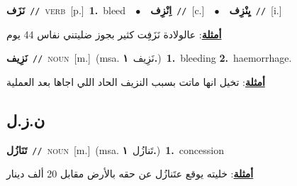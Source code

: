 \documentclass[10pt,a4paper,twoside]{article} %
\begin{document}
\begin{multicols}{2}
{\setlength\topsep{0pt}\textbf{\foreignlanguage{arabic}{نَزَف}}\ {\color{gray}\texttt{//}\color{black}}\ \textsc{verb}\ [p.]\ \textbf{1.}~bleed\ \ $\bullet$\ \ \setlength\topsep{0pt}\textbf{\foreignlanguage{arabic}{اِنْزِف}}\ {\color{gray}\texttt{//}\color{black}}\ [c.]\ \ $\bullet$\ \ \setlength\topsep{0pt}\textbf{\foreignlanguage{arabic}{يِنْزِف}}\ {\color{gray}\texttt{//}\color{black}}\ [i.]\  \begin{flushright}\color{gray}\foreignlanguage{arabic}{\textbf{\underline{\foreignlanguage{arabic}{أمثلة}}}: عالولادة نَزَفِت كثير بجوز ضليتني نفاس 44 يوم}\end{flushright}\color{black}} \vspace{2mm}

{\setlength\topsep{0pt}\textbf{\foreignlanguage{arabic}{نَزِيف}}\ {\color{gray}\texttt{//}\color{black}}\ \textsc{noun}\ [m.]\ \color{gray}(msa. \foreignlanguage{arabic}{نَزِيف}~\foreignlanguage{arabic}{\textbf{١.}})\color{black}\ \textbf{1.}~bleeding  \textbf{2.}~haemorrhage.\  \begin{flushright}\color{gray}\foreignlanguage{arabic}{\textbf{\underline{\foreignlanguage{arabic}{أمثلة}}}: تخيل انها ماتت بسبب النزيف الحاد اللي اجاها بعد العملية}\end{flushright}\color{black}} \vspace{2mm}

\vspace{-3mm}
\subsection*{\color{blue}\foreignlanguage{arabic}{ن.ز.ل}\color{blue}{}} 

{\setlength\topsep{0pt}\textbf{\foreignlanguage{arabic}{تَنَازُل}}\ {\color{gray}\texttt{//}\color{black}}\ \textsc{noun}\ [m.]\ \color{gray}(msa. \foreignlanguage{arabic}{تَنازُل}~\foreignlanguage{arabic}{\textbf{١.}})\color{black}\ \textbf{1.}~concession\  \begin{flushright}\color{gray}\foreignlanguage{arabic}{\textbf{\underline{\foreignlanguage{arabic}{أمثلة}}}: خليته يوقع عتَنازُل عن حقه بالأرض مقابل 20 ألف دينار}\end{flushright}\color{black}} \vspace{2mm}


\end{multicols}
\end{document}
